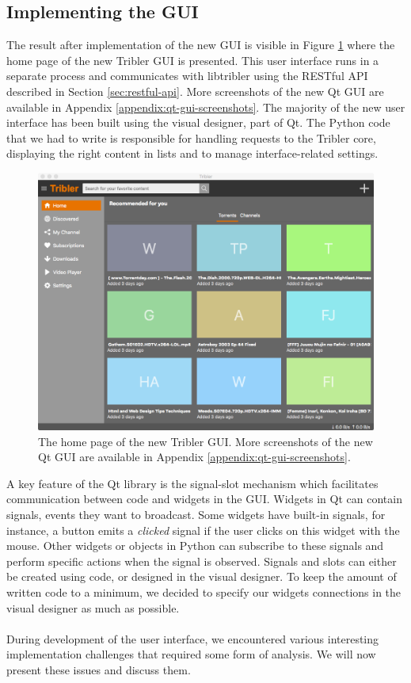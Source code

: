 \subsection{Implementing the GUI}
The result after implementation of the new GUI is visible in Figure \ref{fig:new-gui-1} where the home page of the new Tribler GUI is presented. This user interface runs in a separate process and communicates with libtribler using the RESTful API described in Section \ref{sec:restful-api}. More screenshots of the new Qt GUI are available in Appendix \ref{appendix:qt-gui-screenshots}. The majority of the new user interface has been built using the visual designer, part of Qt. The Python code that we had to write is responsible for handling requests to the Tribler core, displaying the right content in lists and to manage interface-related settings.\\

\begin{figure}[t]
	\centering
	\includegraphics[width=1.0\columnwidth]{images/improving_qa/newgui1}
	\caption{The home page of the new Tribler GUI. More screenshots of the new Qt GUI are available in Appendix \ref{appendix:qt-gui-screenshots}.}
	\label{fig:new-gui-1}
\end{figure}

\noindent A key feature of the Qt library is the signal-slot mechanism which facilitates communication between code and widgets in the GUI. Widgets in Qt can contain signals, events they want to broadcast. Some widgets have built-in signals, for instance, a button emits a \emph{clicked} signal if the user clicks on this widget with the mouse. Other widgets or objects in Python can subscribe to these signals and perform specific actions when the signal is observed. Signals and slots can either be created using code, or designed in the visual designer. To keep the amount of written code to a minimum, we decided to specify our widgets connections in the visual designer as much as possible.\\\\
During development of the user interface, we encountered various interesting implementation challenges that required some form of analysis. We will now present these issues and discuss them.

